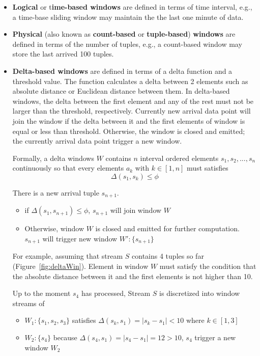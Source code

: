 \begin{itemize}
	\item \textbf{Logical} or t\textbf{ime-based windows} are defined in terms of time interval, e.g., a time-base sliding window may maintain the the last one minute of data.
	
	\item \textbf{Physical} (also known as \textbf{count-based} or \textbf{tuple-based}) \textbf{windows} are defined in terms of the number of tuples, e.g., a count-based window may store the last arrived 100 tuples.
	
	\item \textbf{Delta-based windows} are defined in terms of a delta function and a threshold value. The function calculates a delta between 2 elements such as absolute distance or Euclidean distance between them. In delta-based windows, the delta between the first element and any of the rest must not be larger than the threshold, respectively. Currently new arrival data point will join the window if the delta between it and the first elements of window is equal or less than threshold. Otherwise, the window is closed and emitted; the currently arrival data point trigger a new window. 
	
Formally, a delta windows $W$ contains $n$ interval ordered elements $s_1, s_2,...,s_n$ continuously so that every elements $a_k$ with $k \in [1,n]$ must satisfies
	\begin{equation}
		\Delta(s_1,s_k) \leq \phi
	\end{equation}

There is a new arrival tuple $s_{n+1}$.
\begin{itemize}
\item if $\Delta(s_1,s_{n+1}) \leq \phi$, $s_{n+1}$ will join window $W$
\item Otherwise, window $W$ is closed and emitted for further computation. $s_{n+1}$ will trigger new window $W': \{s_{n+1}\}$
\end{itemize}

	
For example, assuming that stream $S$ contains 4 tuples so far (Figure~\ref{fig:deltaWin}). Element in window $W$ must satisfy the condition that the absolute distance between it and the first elements is not higher than 10.

Up to the moment $s_4$ has processed, Stream $S$ is discretized into window streams of 
\begin{itemize}
\item $W_1:\{s_1,s_2, s_3\}$ satisfies $\Delta(s_k,s_1) =|s_k-s_1| < 10 $ where $k \in [1,3]$
\item $W_2:\{s_4\}$ because $\Delta(s_4,s_1) = |s_4-s_1| = 12 > 10$, $s_4$ trigger a new window $W_2$
\end{itemize}


\end{itemize}
